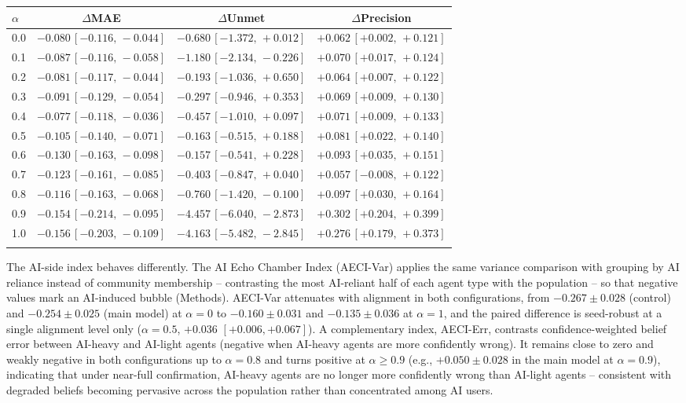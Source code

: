 \documentclass[pdflatex,sn-basic]{sn-jnl}
\begin{document}
\begin{table}[h]
\begin{tabular}{@{}lccc@{}}
\midrule
$\alpha$ & $\Delta$MAE & $\Delta$Unmet & $\Delta$Precision \\
\midrule
0.0 & $\mathbf{-0.080}\,[-0.116,\,-0.044]$ & $-0.680\,[-1.372,\,+0.012]$ & $\mathbf{+0.062}\,[+0.002,\,+0.121]$ \\
0.1 & $\mathbf{-0.087}\,[-0.116,\,-0.058]$ & $\mathbf{-1.180}\,[-2.134,\,-0.226]$ & $\mathbf{+0.070}\,[+0.017,\,+0.124]$ \\
0.2 & $\mathbf{-0.081}\,[-0.117,\,-0.044]$ & $-0.193\,[-1.036,\,+0.650]$ & $\mathbf{+0.064}\,[+0.007,\,+0.122]$ \\
0.3 & $\mathbf{-0.091}\,[-0.129,\,-0.054]$ & $-0.297\,[-0.946,\,+0.353]$ & $\mathbf{+0.069}\,[+0.009,\,+0.130]$ \\
0.4 & $\mathbf{-0.077}\,[-0.118,\,-0.036]$ & $-0.457\,[-1.010,\,+0.097]$ & $\mathbf{+0.071}\,[+0.009,\,+0.133]$ \\
0.5 & $\mathbf{-0.105}\,[-0.140,\,-0.071]$ & $-0.163\,[-0.515,\,+0.188]$ & $\mathbf{+0.081}\,[+0.022,\,+0.140]$ \\
0.6 & $\mathbf{-0.130}\,[-0.163,\,-0.098]$ & $-0.157\,[-0.541,\,+0.228]$ & $\mathbf{+0.093}\,[+0.035,\,+0.151]$ \\
0.7 & $\mathbf{-0.123}\,[-0.161,\,-0.085]$ & $-0.403\,[-0.847,\,+0.040]$ & $+0.057\,[-0.008,\,+0.122]$ \\
0.8 & $\mathbf{-0.116}\,[-0.163,\,-0.068]$ & $\mathbf{-0.760}\,[-1.420,\,-0.100]$ & $\mathbf{+0.097}\,[+0.030,\,+0.164]$ \\
0.9 & $\mathbf{-0.154}\,[-0.214,\,-0.095]$ & $\mathbf{-4.457}\,[-6.040,\,-2.873]$ & $\mathbf{+0.302}\,[+0.204,\,+0.399]$ \\
1.0 & $\mathbf{-0.156}\,[-0.203,\,-0.109]$ & $\mathbf{-4.163}\,[-5.482,\,-2.845]$ & $\mathbf{+0.276}\,[+0.179,\,+0.373]$ \\
\botrule
\end{tabular}
\end{table}

The AI-side index behaves differently. The AI Echo Chamber Index (AECI-Var) applies the same variance comparison with grouping by AI reliance instead of community membership -- contrasting the most AI-reliant half of each agent type with the population -- so that negative values mark an AI-induced bubble (Methods). AECI-Var attenuates with alignment in both configurations, from $-0.267 \pm 0.028$ (control) and $-0.254 \pm 0.025$ (main model) at $\alpha = 0$ to $-0.160 \pm 0.031$ and $-0.135 \pm 0.036$ at $\alpha = 1$, and the paired difference is seed-robust at a single alignment level only ($\alpha = 0.5$, $+0.036$ $[+0.006, +0.067]$). A complementary index, AECI-Err, contrasts confidence-weighted belief error between AI-heavy and AI-light agents (negative when AI-heavy agents are more confidently wrong). It remains close to zero and weakly negative in both configurations up to $\alpha = 0.8$ and turns positive at $\alpha \geq 0.9$ (e.g., $+0.050 \pm 0.028$ in the main model at $\alpha = 0.9$), indicating that under near-full confirmation, AI-heavy agents are no longer more confidently wrong than AI-light agents -- consistent with degraded beliefs becoming pervasive across the population rather than concentrated among AI users.
\end{document}
